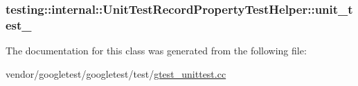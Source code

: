 \subsubsection[{\texorpdfstring{unit\+\_\+test\+\_\+}{unit_test_}}]{ testing\+::internal\+::\+Unit\+Test\+Record\+Property\+Test\+Helper\+::unit\+\_\+test\+\_\+\hspace{0.3cm}{\ttfamily [protected]}}\hypertarget{classtesting_1_1internal_1_1UnitTestRecordPropertyTestHelper_a415e13a354d3b8bd97db96aae5ef5df1}{}\label{classtesting_1_1internal_1_1UnitTestRecordPropertyTestHelper_a415e13a354d3b8bd97db96aae5ef5df1}


The documentation for this class was generated from the following file\+:\begin{DoxyCompactItemize}
\item 
vendor/googletest/googletest/test/\hyperlink{gtest__unittest_8cc}{gtest\+\_\+unittest.\+cc}\end{DoxyCompactItemize}
